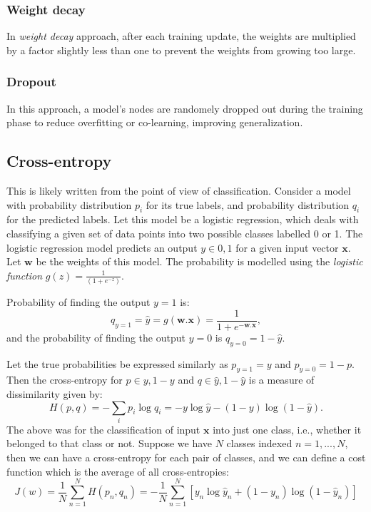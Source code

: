 \subsubsection{Weight decay}
\label{sec:weight_decay}
In \emph{weight decay} approach, after each training update, the weights are multiplied by a factor slightly less than one to prevent the weights from growing too large. 

\subsubsection[Dropout]{Dropout\cite{Brownlee2018}}
\label{sec:dropout}
In this approach, a model's nodes are randomely dropped out during the training phase to reduce overfitting or co-learning, improving generalization.

\subsection[Cross-entropy]{Cross-entropy\cite{WikiCrossEntropy}}
\label{sec:cross_entropy}
This is likely written from the point of view of classification. 
Consider a model with probability distribution $p_i$ for its true labels, and probability distribution $q_i$ for the predicted labels.
Let this model be a logistic regression, which deals with classifying a given set of data points into two possible classes labelled 0 or 1. The logistic regression model predicts an output $y \in {0,1}$ for a given input vector $\mathbf{x}$. Let $\mathbf{w}$ be the weights of this model. The probability is modelled using the \emph{logistic function} $g(z) = \frac{1}{(1 + e^{-z})}$. 

Probability of finding the output $y = 1$ is:
\begin{equation}
    q_{y=1} = \hat y = g(\mathbf{w}.\mathbf{x}) = \frac{1}{1 + e^{-\mathbf{w}.\mathbf{x}}},
\end{equation}
and the probability of finding the output $y=0$ is $q_{y=0} = 1 - \hat y$. 

Let the true probabilities be expressed similarly as $p_{y=1}=y$ and $p_{y=0}=1-p$. Then the cross-entropy for $p \in {y,1-y}$ and $q \in {\hat y, 1- \hat y}$ is a measure of dissimilarity given by:
\begin{equation}
    H(p,q) = - \sum_i p_i \log q_i = -y \log\hat y - (1 - y)\log(1 - \hat y).
\end{equation}
The above was for the classification of input $\mathbf{x}$ into just one class, i.e., whether it belonged to that class or not. Suppose we have $N$ classes indexed $n=1,...,N$, then we can have a cross-entropy for each pair of classes, and we can define a cost function which is the average of all cross-entropies:
\begin{equation}
    J(w) = \frac{1}{N} \sum_{n=1}^N H(p_n,q_n) = -\frac{1}{N}\sum_{n=1}^N \left[y_n \log\hat y_n + (1 - y_n)\log(1 - \hat y_n)\right]
\end{equation}

